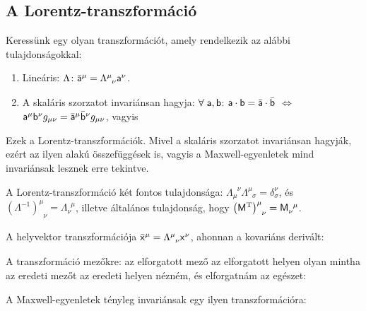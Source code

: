   \subsection{A Lorentz-transzformáció}
   
   Keressünk egy olyan transzformációt, amely rendelkezik az alábbi tulajdonságokkal:
   \begin{enumerate}
    \item Lineáris: $\Lambda\colon \bar{\mathsf{a}}^\mu=\Lambda^\mu_{\phantom{\mu}\nu} \mathsf{a}^\nu$.
    \item A skaláris szorzatot invariánsan hagyja: $\forall\; \mathsf{a},\mathsf{b}$: $\mathsf{a}\cdot \mathsf{b}=\bar{\mathsf{a}}\cdot\bar{\mathsf{b}}$ $\Leftrightarrow$ $\mathsf{a}^\mu \mathsf{b}^\nu g_{\mu\nu}=\bar{\mathsf{a}}^\mu \bar{\mathsf{b}}^\nu g_{\mu\nu}$, vagyis
   \end{enumerate}
   Ezek a Lorentz-transzformációk. Mivel a skaláris szorzatot invariánsan hagyják, ezért az ilyen alakú összefüggések is, vagyis a Maxwell-egyenletek mind invariánsak lesznek erre tekintve. 
   
   A Lorentz-transzformáció két fontos tulajdonsága: $\Lambda_\mu^{\phantom{\mu}\nu}\Lambda^\mu_{\phantom{\mu}\sigma}=\delta_\sigma^\nu$, és $(\Lambda^{-1})^\mu_{\phantom{\mu}\nu}=\Lambda_\nu^{\phantom{\nu}\mu}$, illetve általános tulajdonság, hogy $\big(\mathsf{M}^\text{T}\big)^\mu_{\phantom{\mu}\nu}=\mathsf{M}^{\phantom{\nu}\mu}_{\nu}$.
   
   A helyvektor transzformációja $\bar{\mathsf{x}}^\mu=\Lambda^\mu_{\phantom{\mu}\nu} \mathsf{x}^\nu$, ahonnan a kovariáns derivált:
   
   A transzformáció mezőkre: az elforgatott mező az elforgatott helyen olyan mintha az eredeti mezőt az eredeti helyen nézném, és elforgatnám az egészet:
   
   A Maxwell-egyenletek tényleg invariánsak egy ilyen transzformációra:
   
